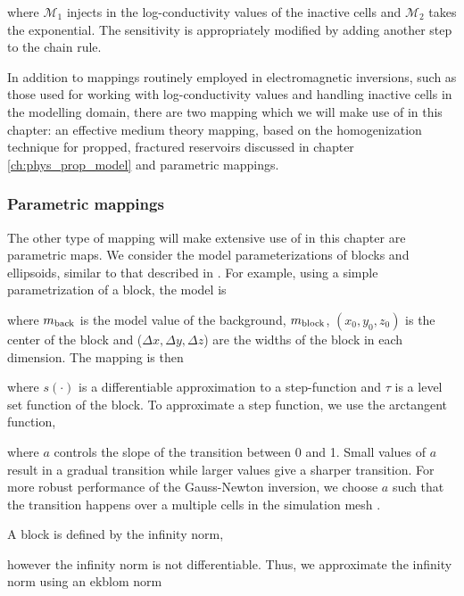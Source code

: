 
where $\mathcal{M}_1$ injects in the log-conductivity values of the inactive cells and $\mathcal{M}_2$ takes the exponential. The sensitivity is appropriately modified by adding another step to the chain rule.

In addition to mappings routinely employed in electromagnetic inversions, such as those used for working with log-conductivity values and handling inactive cells in the modelling domain, there are two mapping which we will make use of in this chapter: an effective medium theory mapping, based on the homogenization technique for propped, fractured reservoirs discussed in chapter \ref{ch:phys_prop_model} and parametric mappings.

\subsubsection{Parametric mappings}

The other type of mapping will make extensive use of in this chapter are parametric maps. We consider the model parameterizations of blocks and ellipsoids, similar to that described in \cite{McMillan2015a, Mcmillan2017}. For example, using a simple parametrization of a block, the model is


where $m_{\rm back}$ is the model value of the background, $m_{\rm block}$, $(x_0, y_0, z_0)$ is the center of the block and ($\Delta x, \Delta y, \Delta z$) are the widths of the block in each dimension. The mapping is then


where $s(\cdot)$ is a differentiable approximation to a step-function and $\tau$ is a level set function of the block. To approximate a step function, we use the arctangent function,


where $a$ controls the slope of the transition between 0 and 1. Small values of $a$ result in a gradual transition while larger values give a sharper transition. For more robust performance of the Gauss-Newton inversion, we choose $a$ such that the transition happens over a multiple cells in the simulation mesh \citep{Mcmillan2017}.

A block is defined by the infinity norm,


however the infinity norm is not differentiable. Thus, we approximate the infinity norm using an ekblom norm

